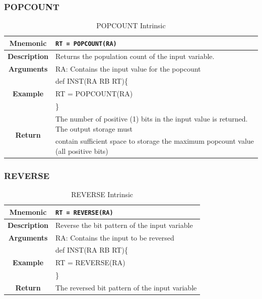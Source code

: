 \documentclass{article}
\begin{document}
\clearpage
\subsubsection{POPCOUNT}
\label{sec:POPCOUNT}

\begin{table}[h]
\begin{center}
\caption{POPCOUNT Intrinsic}
\vspace{0.125in}
\label{tab:POPCOUNTIntrinsic}
\begin{tabular}{|c|l|}
\hline
\textbf{Mnemonic} & \texttt{RT = POPCOUNT(RA)}\\
\hline
\textbf{Description} & Returns the population count of the input variable.\\
\hline
\textbf{Arguments} & RA: Contains the input value for the popcount\\
                          			     
\hline
\multirow{3}{*}{\textbf{Example}} & def INST(RA RB RT)\{\\
                          			  &   RT = POPCOUNT(RA)\\
                                                    & \}\\
\hline
\multirow{2}{*}{\textbf{Return}} & The number of positive (1) bits in the input value is returned.  The output storage must \\
			& contain sufficient space to storage the maximum popcount value (all positive bits)\\                                                    
\hline
\end{tabular}
\end{center}
\end{table}

\clearpage
\subsubsection{REVERSE}
\label{sec:REVERSE}

\begin{table}[h]
\begin{center}
\caption{REVERSE Intrinsic}
\vspace{0.125in}
\label{tab:REVERSEIntrinsic}
\begin{tabular}{|c|l|}
\hline
\textbf{Mnemonic} & \texttt{RT = REVERSE(RA)}\\
\hline
\textbf{Description} & Reverse the bit pattern of the input variable\\
\hline
\textbf{Arguments} & RA: Contains the input to be reversed\\
\hline
\multirow{3}{*}{\textbf{Example}} & def INST(RA RB RT)\{\\
                          			  &   RT = REVERSE(RA)\\
                                                    & \}\\
\hline
\textbf{Return} & The reversed bit pattern of the input variable\\                                                    
\hline
\end{tabular}
\end{center}
\end{table}
\end{document}
